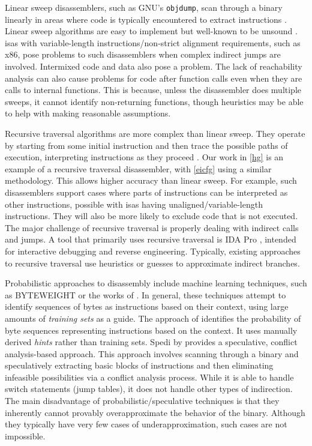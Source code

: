 Linear sweep disassemblers, such as GNU's
\lstinline|objdump|, scan through a binary linearly
in areas where code is typically encountered
to extract instructions \autocite{schwartz2002disassembly}.
Linear sweep algorithms are easy to implement but well-known to be unsound \autocite{schwartz2002disassembly}.
\Acp{isa} with variable-length instructions/non-strict alignment requirements, such as \gls{x86}, pose problems to such disassemblers when complex indirect jumps are involved.
Intermixed code and data also pose a problem.
The lack of reachability analysis can also cause problems for code after function calls even when they are calls to internal functions.
This is because, unless the disassembler does multiple sweeps, it cannot identify non-returning functions, though heuristics may be able to help with making reasonable assumptions.

Recursive traversal algorithms are more complex than linear sweep.
They operate by starting from some initial instruction and then trace the possible paths of execution, interpreting instructions as they proceed \autocite{schwartz2002disassembly,kruegel2004static}.
Our work in \cref{hg} is an example of a recursive traversal disassembler, with \cref{eicfg} using a similar methodology.
This allows higher accuracy than linear sweep.
For example, such disassemblers support cases where parts of instructions can be interpreted as other instructions, possible with \acp{isa} having unaligned/variable-length instructions.
They will also be more likely to exclude code that is not executed.
The major challenge of recursive traversal is properly dealing with indirect calls and jumps.
A tool that primarily uses recursive traversal is IDA Pro \autocite{ida}, intended for interactive debugging and reverse engineering.
Typically, existing approaches to recursive traversal use heuristics or guesses to approximate indirect branches.

Probabilistic approaches to disassembly \autocite{khadra2016speculative,miller2019probabilistic} include machine learning techniques, such as BYTEWEIGHT \autocite{bao2014byteweight} or the works of \textcite{wartell2011differentiating,wartell2014shingled}.
In general, these techniques attempt to identify sequences of bytes as instructions based on their context, using large amounts of \emph{training sets} as a guide.
The approach of \textcite{miller2019probabilistic} identifies the probability of byte sequences representing instructions based on the context.
It uses manually derived \emph{hints} rather than training sets.
Spedi by \textcite{khadra2016speculative} provides a speculative, conflict analysis-based approach.
This approach involves scanning through a binary and speculatively extracting basic blocks of instructions and then eliminating infeasible possibilities via a conflict analysis process.
While it is able to handle switch statements (jump tables), it does not handle other types of indirection.
The main disadvantage of probabilistic/speculative techniques is that they inherently cannot provably overapproximate the behavior of the binary.
Although they typically have very few cases of underapproximation, such cases are not impossible.

